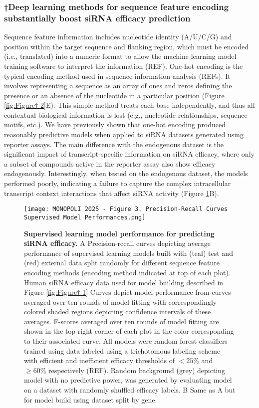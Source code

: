 \documentclass{report}
\begin{document}
\subsubsection{†Deep learning methods for sequence feature encoding substantially boost siRNA efficacy prediction}

Sequence feature information includes nucleotide identity (A/U/C/G) and position within the target sequence and flanking region, which must be encoded (i.e., translated) into a numeric format to allow the machine learning model training software to interpret the information (REF).  One-hot encoding is the typical encoding method used in sequence information analysis (REFs). It involves representing a sequence as an array of ones and zeros defining the presence or an absence of the nucleotide in a particular position (Figure \ref{fig:Figure† 2}E). This simple method treats each base independently, and thus all contextual biological information is lost (e.g., nucleotide relationships, sequence motifs, etc.). We have previously shown that one-hot encoding produced reasonably predictive models when applied to siRNA datasets generated using reporter assays. The main difference with the endogenous dataset is the significant impact of transcript-specific information on siRNA efficacy, where only a subset of compounds active in the reporter assay also show efficacy endogenously. Interestingly, when tested on the endogenous dataset, the models performed poorly, indicating a failure to capture the complex intracellular transcript context interactions that affect siRNA activity (Figure \ref{fig:Figure† 3}B).

\begin{figure}
    \centering
    \texttt{[image: MONOPOLI 2025 - Figure 3. Precision-Recall Curves Supervised Model Performances.png]}
    \caption{\textbf{Supervised learning model performance for predicting siRNA efficacy.} A Precision-recall curves depicting average performance of supervised learning models built with (teal) test and (red) external data split randomly for different sequence feature encoding methods (encoding method indicated at top of each plot). Human siRNA efficacy data used for model building described in Figure \ref{fig:Figure† 1} Curves depict model performance from curves averaged over ten rounds of model fitting with correspondingly colored shaded regions depicting confidence intervals of these averages. F-scores averaged over ten rounds of model fitting are shown in the top right corner of each plot in the color corresponding to their associated curve. All models were random forest classifiers trained using data labeled using a trichotomous labeling scheme with efficient and inefficient efficacy thresholds of $<25\%$ and $\geq60\%$ respectively (REF). Random background (grey) depicting model with no predictive power, was generated by evaluating model on a dataset with randomly shuffled efficacy labels. B Same as A but for model build using dataset split by gene. 
}
    \label{fig:Figure† 3}
\end{figure}
\end{document}
